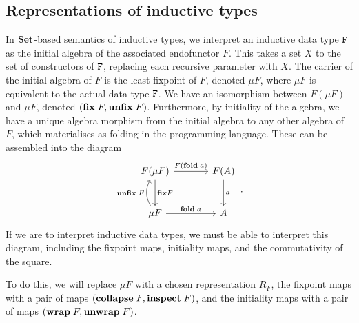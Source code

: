 \subsection{Representations of inductive types}
In $\mathbf{Set}$-based semantics of inductive types, we interpret an inductive data
type $\texttt{F}$ as the initial algebra of the associated endofunctor $F$. This
takes a set $X$ to the set of constructors of $\texttt{F}$, replacing each
recursive parameter with $X$. The carrier of the initial algebra of $F$ is the
least fixpoint of $F$, denoted $\mu F$, where $\mu F$ is equivalent to the
actual data type $\texttt{F}$. We have an isomorphism between $F(\mu F)$ and
$\mu F$, denoted $(\textbf{fix}\;F, \textbf{unfix}\;F)$. Furthermore, by initiality
of the algebra, we have a unique algebra morphism from the initial algebra to
any other algebra of $F$, which materialises as folding in the programming
language. These can be assembled into the diagram
\begin{equation*}
  \begin{tikzcd}[column sep=large, row sep=large]
    F(\mu F) \ar[r, "F(\mta{fold}\;a)"] \ar[d, "\mta{fix} F"] & F(A) \ar[d, "a"] \\
    \mu F \ar[u, bend left, "\mta{unfix}\;F"] \ar[r, "\mta{fold}\;a"] & A
  \end{tikzcd} \,.
\end{equation*}
If we are to interpret inductive data types, we must be able to interpret
this diagram, including the fixpoint maps, initiality maps, and the commutativity
of the square. 

To do this, we will replace $\mu F$ with a chosen representation $R_F$, the
fixpoint maps with a pair of maps $(\textbf{collapse}\;F, \textbf{inspect}\;F)$, and
the initiality maps with a pair of maps $(\textbf{wrap}\;F, \textbf{unwrap}\;F)$.

